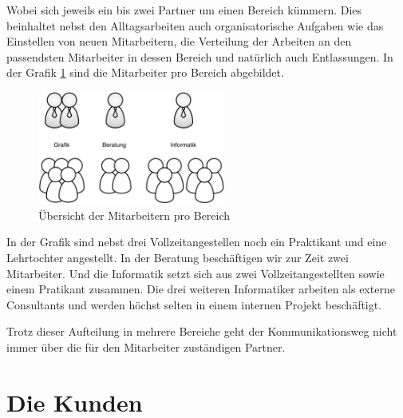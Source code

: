 Wobei sich jeweils ein bis zwei Partner um einen
Bereich kümmern. Dies beinhaltet nebst den Alltagsarbeiten auch organisatorische 
Aufgaben wie das Einstellen von neuen Mitarbeitern, die Verteilung der Arbeiten an den 
passendsten Mitarbeiter in dessen Bereich und natürlich auch Entlassungen.
In der Grafik \ref{pic:mitarbeiter_pro_bereich} sind die Mitarbeiter pro Bereich
abgebildet.

\begin{figure}[htbp]
\begin{center}
\includegraphics[width=0.55\textwidth,angle=0]{./bilder/mitarbeiter_pro_bereich.pdf}
\caption{Übersicht der Mitarbeitern pro Bereich}
\label{pic:mitarbeiter_pro_bereich}
\end{center}
\end{figure}

In der Grafik sind nebst drei Vollzeitangestellen noch ein Praktikant und eine
Lehrtochter angestellt. In der Beratung beschäftigen wir zur Zeit zwei Mitarbeiter.
Und die Informatik setzt sich aus zwei Vollzeitangestellten sowie einem Pratikant
zusammen. Die drei weiteren Informatiker arbeiten als externe Consultants und
werden höchst selten in einem internen Projekt beschäftigt.

Trotz dieser Aufteilung in mehrere Bereiche geht der Kommunikationsweg nicht
immer über die für den Mitarbeiter zuständigen Partner. 

\section{Die Kunden}


